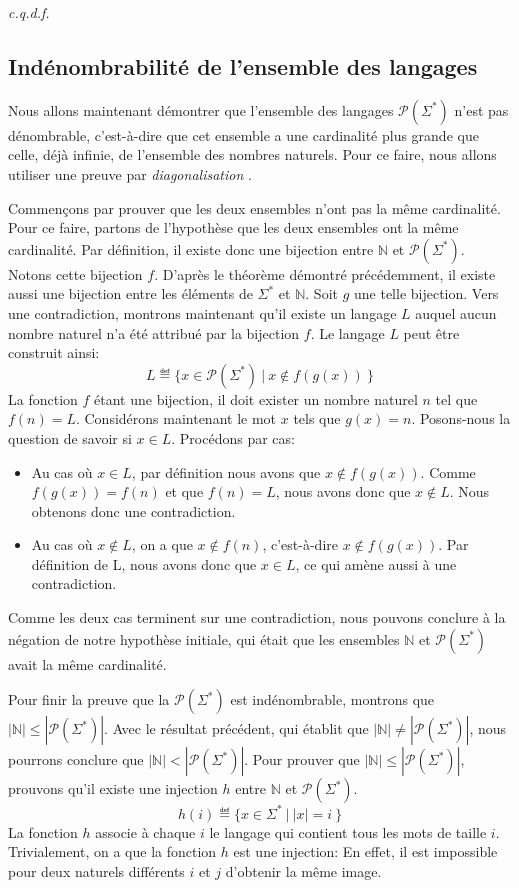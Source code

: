 \textit{c.q.d.f.}

\subsection{Indénombrabilité de l'ensemble des langages}

Nous allons maintenant démontrer que l'ensemble des langages $\mathcal{P}(\Sigma^*)$ n'est pas dénombrable, c'est-à-dire que cet ensemble a une cardinalité plus grande que celle, déjà infinie, de l'ensemble des nombres naturels.
Pour ce faire, nous allons utiliser une preuve par \og \textit{diagonalisation} \fg{}.

Commençons par prouver que les deux ensembles n'ont pas la même cardinalité.
Pour ce faire, partons de l'hypothèse que les deux ensembles ont la même cardinalité.
Par définition, il existe donc une bijection entre $\mathbb{N}$ et $\mathcal{P}(\Sigma^*)$.
Notons cette bijection $f$.
D'après le théorème démontré précédemment, il existe aussi une bijection entre les éléments de $\Sigma^*$ et $\mathbb{N}$.
Soit $g$ une telle bijection. 
Vers une contradiction, montrons maintenant qu'il existe un langage $L$ auquel aucun nombre naturel n'a été attribué par la bijection $f$.
Le langage $L$ peut être construit ainsi: 
\[
L \eqdef \{ x \in \mathcal{P}(\Sigma^*)\ |\ x \not\in f(g(x))\ \}
\]
La fonction $f$ étant une bijection, il doit exister un nombre naturel $n$ tel que $f(n) = L$.
Considérons maintenant le mot $x$ tels que $g(x) = n$.
Posons-nous la question de savoir si $x \in L$.
Procédons par cas:
\begin{itemize}
\item
Au cas où $x \in L$, par définition nous avons que $x \not\in f(g(x))$.
Comme $f(g(x)) = f(n)$ et que $f(n) = L$, nous avons donc que $x \not\in L$.
Nous obtenons donc une contradiction.
\item
Au cas où $x \not\in L$, on a que $x \not\in f(n)$, c'est-à-dire $x \not\in f(g(x))$.
Par définition de L, nous avons donc que $x \in L$, ce qui amène aussi à une contradiction.
\end{itemize}
Comme les deux cas terminent sur une contradiction, nous pouvons conclure à la négation de notre hypothèse initiale, qui était que les ensembles $\mathbb{N}$ et $\mathcal{P}(\Sigma^*)$ avait la même cardinalité.

Pour finir la preuve que la $\mathcal{P}(\Sigma^*)$ est indénombrable, montrons que $|\mathbb{N}| \leq |\mathcal{P}(\Sigma^*)|$. Avec le résultat précédent, qui établit que $|\mathbb{N}| \neq |\mathcal{P}(\Sigma^*)|$, nous pourrons conclure que $|\mathbb{N}| < |\mathcal{P}(\Sigma^*)|$.
Pour prouver que $|\mathbb{N}| \leq |\mathcal{P}(\Sigma^*)|$, prouvons qu'il existe une injection $h$ entre $\mathbb{N}$ et $\mathcal{P}(\Sigma^*)$.
\[
h(i) \eqdef \{ x \in \Sigma^*\ |\ |x| = i\ \}
\]
La fonction $h$ associe à chaque $i$ le langage qui contient tous les mots de taille $i$. Trivialement, on a que la fonction $h$ est une injection: En effet, il est impossible pour deux naturels différents $i$ et $j$ d'obtenir la même image.

